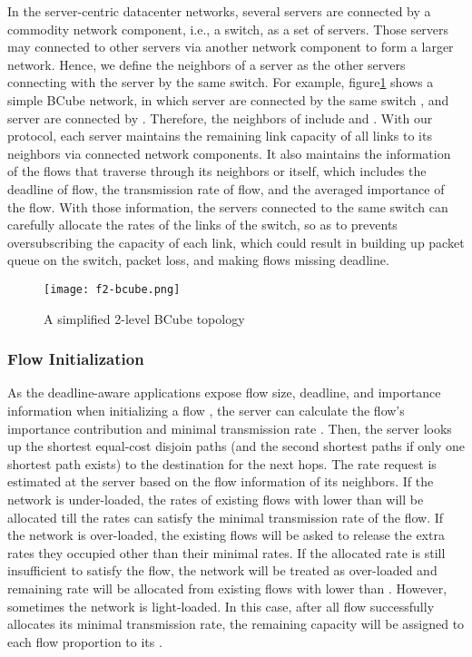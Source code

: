 \documentclass[conference]{IEEEtran}
\begin{document}
In the server-centric datacenter networks, several servers are connected by a commodity network component, i.e., a switch, as a set of servers. Those servers may connected to other servers via another network component to form a larger network. Hence, we define the neighbors of a server as the other servers connecting with the server by the same switch. For example, figure\ref{fig:bcube} shows a simple BCube\cite{bcube} network, in which server  are connected by the same switch , and server  are connected by . Therefore, the neighbors of  include  and . With our protocol, each server maintains the remaining link capacity of all links to its neighbors via connected network components. It also maintains the information of the flows that traverse through its neighbors or itself, which includes the deadline of flow, the transmission rate of flow, and the averaged importance of the flow.
With those information, the servers connected to the same switch can carefully allocate the rates of the links of the switch, so as to prevents oversubscribing the capacity of each link, which could result in building up packet queue on the switch, packet loss, and making flows missing deadline.

\begin{figure}
  \centering
\texttt{[image: f2-bcube.png]}\\
  \caption{A simplified 2-level BCube topology}\label{fig:bcube}
\end{figure}

\subsubsection{Flow Initialization}

As the deadline-aware applications expose flow size, deadline, and importance information when initializing a flow , the server can calculate the flow's importance contribution  and minimal transmission rate . Then, the server looks up the shortest equal-cost disjoin paths (and the second shortest paths if only one shortest path exists) to the destination for the next hops. The rate request is estimated at the server based on the flow information of its neighbors. If the network is under-loaded, the rates of existing flows with lower  than  will be allocated till the rates can satisfy the minimal transmission rate of the flow. If the network is over-loaded, the existing flows will be asked to release the extra rates they occupied other than their minimal rates. If the allocated rate is still insufficient to satisfy the flow, the network will be treated as over-loaded and remaining rate will be allocated from existing flows with lower  than . However, sometimes the network is light-loaded. In this case, after all flow successfully allocates its minimal transmission rate, the remaining capacity will be assigned to each flow proportion to its .
\end{document}
